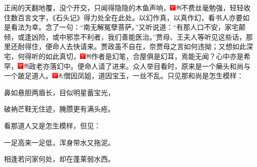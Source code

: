 正闹的天翻地覆，没个开交，只闻得隐隐的木鱼声响，{\includegraphics[width=3mm]{../Images/00002}\includegraphics[width=3mm]{../Images/00011}\footnotesize \kaishu 不费丝毫勉强，轻轻收住数百言文字，《石头记》得力处全在此处。以幻作真，以真作幻，看书人亦要如是看法为幸。}念了一句：``南无解冤孽菩萨。''又听说道：``有那人口不安，家宅颠倾，或逢凶险，或中邪祟不利者，我们善能医治。''贾母、王夫人等听见这些话，那里还耐得住，便命人去快请来。贾政虽不自在，奈贾母之言如何违拗；又想如此深宅，何得听的如此真切，{\includegraphics[width=3mm]{../Images/00002}\includegraphics[width=3mm]{../Images/00011}\footnotesize \kaishu 作者是幻笔，合屋俱是幻耳，焉能无闻？}心中亦是希罕，{\includegraphics[width=3mm]{../Images/00002}\includegraphics[width=3mm]{../Images/00011}\footnotesize \kaishu 政老亦落幻中。}便命人请了进来。众人举目看时，原来是一个癞头和尚与一个跛足道人。{\includegraphics[width=3mm]{../Images/00002}\includegraphics[width=3mm]{../Images/00012}\footnotesize \kaishu 僧因凤姐，道因宝玉，一丝不乱。}只见那和尚是怎生模样：

鼻如悬胆两眉长，目似明星蓄宝光，

破衲芒鞋无住迹，腌臜更有满头疮。

看那道人又是怎生模样，但见：

一足高来一足低，浑身带水又拖泥。

相逢若问家何处，却在蓬莱弱水西。

